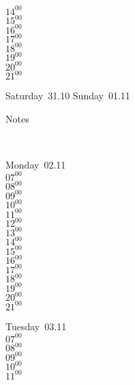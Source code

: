 \documentclass[11pt,a4paper]{book}\usepackage[]{graphicx}\usepackage[]{color}
\begin{document}
{{{{{{{{{{{{{{{{{\begin{tcolorbox}
{$14^{00}$\\
$15^{00}$\\
$16^{00}$\\
$17^{00}$\\
$18^{00}$\\
$19^{00}$\\
$20^{00}$\\
$21^{00}$}\\
\end{tcolorbox} 
%
\begin{tcolorbox}[height=(\textheight-10mm)/6]
Saturday~31.10
\tcblower
Sunday~01.11
\end{tcolorbox} %
%
\begin{tcolorbox}[height=(\textheight-10mm)/6,sidebyside=false]
Notes
\end{tcolorbox}
\clearpage
\vspace{2 mm}\\
%
%
\begin{tcolorbox}
Monday~02.11\\
{ 
$07^{00}$\\
$08^{00}$\\
$09^{00}$\\
$10^{00}$\\
$11^{00}$\\
$12^{00}$\\
$13^{00}$\\
$14^{00}$\\
$15^{00}$\\
$16^{00}$\\
$17^{00}$\\
$18^{00}$\\
$19^{00}$\\
$20^{00}$\\
$21^{00}$}\\
\end{tcolorbox}
%
\begin{tcolorbox}
Tuesday~03.11\\
{ 
$07^{00}$\\
$08^{00}$\\
$09^{00}$\\
$10^{00}$\\
$11^{00}$\\
}
\end{tcolorbox}}}}}}}}}}}}}}}}}}
\end{document}
